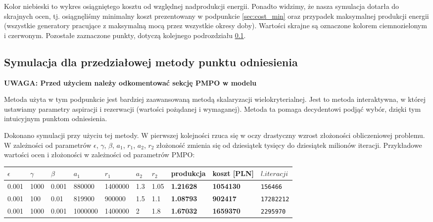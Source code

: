 \documentclass[12pt, twoside, hidelinks, a4paper]{article}
\begin{document}
Kolor niebieski to wykres osiągniętego kosztu od względnej nadprodukcji energii. Ponadto widzimy, że nasza symulacja dotarła do skrajnych ocen, tj. osiągnęliśmy minimalny koszt prezentowany w podpunkcie \ref{sec:cost_min} oraz przypadek maksymalnej produkcji energii (wszystkie generatory pracujące z maksymalną mocą przez wszystkie okresy doby). Wartości skrajne są oznaczone kolorem ciemnozielonym i czerwonym. Pozostałe zaznaczone punkty, dotyczą kolejnego podrozdziału \ref{sec:pmpo}.

\subsection{Symulacja dla przedziałowej metody punktu odniesienia} \label{sec:pmpo}
\textbf{UWAGA: Przed użyciem należy odkomentować sekcję PMPO w modelu}

Metoda użyta w tym podpunkcie jest bardziej zaawansowaną metodą skalaryzacji wielokryterialnej. Jest to metoda interaktywna, w której ustawiamy parametry aspiracji i rezerwacji (wartości pożądanej i wymaganej). Metoda ta pomaga decydentowi podjąć wybór, dzięki tym intuicyjnym punktom odniesienia.

Dokonano symulacji przy użyciu tej metody. W pierwszej kolejności rzuca się w oczy drastyczny wzrost złożoności obliczeniowej problemu. W zależności od parametrów $\epsilon$, $\gamma$, $\beta$, $a_1$, $r_1$, $a_2$, $r_2$ złożoność zmienia się od dziesiątek tysięcy do dziesiątek milionów iteracji. Przykładowe wartości ocen i złożoności w zależności od parametrów PMPO:

\begin{table}[H]
\begin{tabular}{llllllllll}
$\epsilon$ & $\gamma$ & $\beta$ & $a_1$ & $r_1$ & $a_2$ & $r_2$ & \textbf{produkcja} & \textbf{koszt [PLN]} & $l. iteracji$ \\ \hline
0.001                            & 1000                           & 0.001                         & 880000        & 1400000       & 1.3           & 1.05          & \textbf{1.21628}            & \textbf{1054130}        & \texttt{156466}               \\
0.001                            & 100                            & 0.01                          & 819900        & 900000        & 1.5           & 1.1           & \textbf{1.08793}            & \textbf{902417}         & \texttt{17282212}             \\
0.001                            & 1000                           & 0.001                         & 1000000       & 1400000       & 2             & 1.8           & \textbf{1.67032}            & \textbf{1659370}        & \texttt{2295970}             
\end{tabular}
\end{table}
\end{document}
